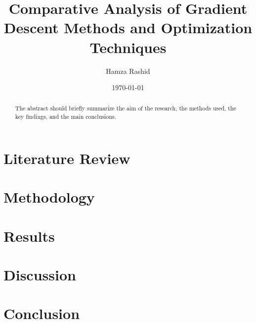 \documentclass[12pt]{article}
\title{Comparative Analysis of Gradient Descent Methods and Optimization Techniques}
\author[1]{Hamza Rashid}
\affil[1]{Mathematics and Statistics, McGill University, Montreal, Canada}
\date{\today}
\begin{document}
\maketitle

\begin{abstract}
The abstract should briefly summarize the aim of the research, the methods used, the key findings, and the main conclusions.
\end{abstract}



\section{Literature Review}


\section{Methodology}


\section{Results}


\section{Discussion}


\section{Conclusion}




\end{document}
